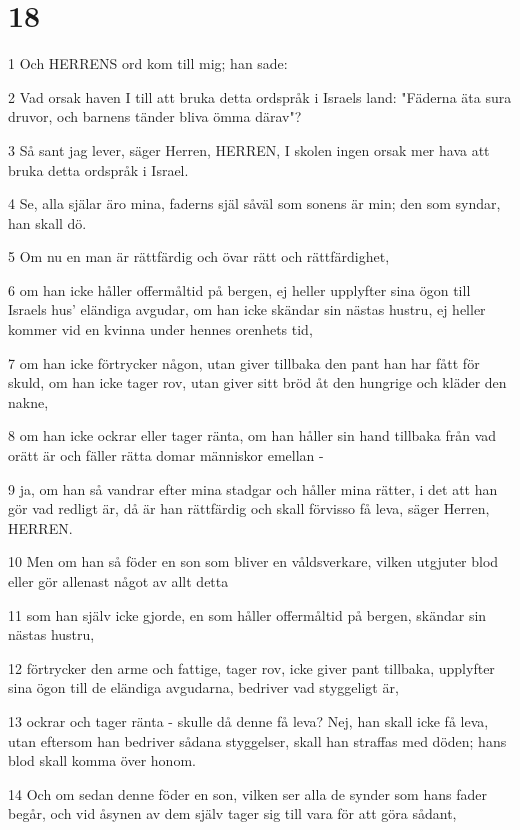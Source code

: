 \chapter{18}

\par 1 Och HERRENS ord kom till mig; han sade:
\par 2 Vad orsak haven I till att bruka detta ordspråk i Israels land: "Fäderna äta sura druvor, och barnens tänder bliva ömma därav"?
\par 3 Så sant jag lever, säger Herren, HERREN, I skolen ingen orsak mer hava att bruka detta ordspråk i Israel.
\par 4 Se, alla själar äro mina, faderns själ såväl som sonens är min; den som syndar, han skall dö.
\par 5 Om nu en man är rättfärdig och övar rätt och rättfärdighet,
\par 6 om han icke håller offermåltid på bergen, ej heller upplyfter sina ögon till Israels hus' eländiga avgudar, om han icke skändar sin nästas hustru, ej heller kommer vid en kvinna under hennes orenhets tid,
\par 7 om han icke förtrycker någon, utan giver tillbaka den pant han har fått för skuld, om han icke tager rov, utan giver sitt bröd åt den hungrige och kläder den nakne,
\par 8 om han icke ockrar eller tager ränta, om han håller sin hand tillbaka från vad orätt är och fäller rätta domar människor emellan -
\par 9 ja, om han så vandrar efter mina stadgar och håller mina rätter, i det att han gör vad redligt är, då är han rättfärdig och skall förvisso få leva, säger Herren, HERREN.
\par 10 Men om han så föder en son som bliver en våldsverkare, vilken utgjuter blod eller gör allenast något av allt detta
\par 11 som han själv icke gjorde, en som håller offermåltid på bergen, skändar sin nästas hustru,
\par 12 förtrycker den arme och fattige, tager rov, icke giver pant tillbaka, upplyfter sina ögon till de eländiga avgudarna, bedriver vad styggeligt är,
\par 13 ockrar och tager ränta - skulle då denne få leva? Nej, han skall icke få leva, utan eftersom han bedriver sådana styggelser, skall han straffas med döden; hans blod skall komma över honom.
\par 14 Och om sedan denne föder en son, vilken ser alla de synder som hans fader begår, och vid åsynen av dem själv tager sig till vara för att göra sådant,
